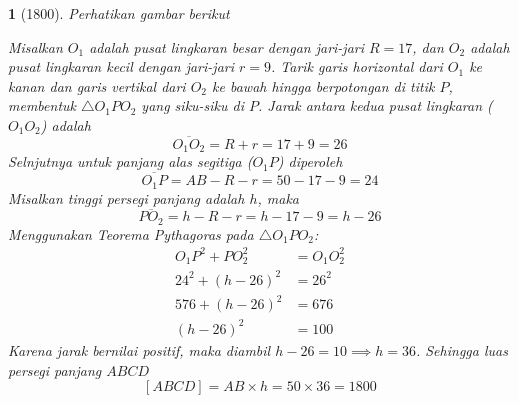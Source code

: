 \documentclass[11pt,a4paper,DIV=12]{scrartcl}
\theoremstyle{problemstyle}
\theoremstyle{answerstyle}
\newtheorem{answer}{}
\begin{document}
\begin{answer}[1800]
  Perhatikan gambar berikut
  \begin{center}
  \end{center}
  Misalkan $O_1$ adalah pusat lingkaran besar dengan jari-jari $R=17$, dan $O_2$ adalah pusat lingkaran kecil dengan jari-jari $r=9$.
  Tarik garis horizontal dari $O_1$ ke kanan dan garis vertikal dari $O_2$ ke bawah hingga berpotongan di titik $P$, membentuk $\triangle O_1PO_2$ yang siku-siku di $P$.
  Jarak antara kedua pusat lingkaran ($O_1O_2$) adalah
  $$ \overline{O_1O_2} = R + r = 17 + 9 = 26 $$
  Selnjutnya untuk panjang alas segitiga ($O_1P$) diperoleh
  $$ \overline{O_1P} = AB - R - r = 50 - 17 - 9 = 24 $$
  Misalkan tinggi persegi panjang adalah $h$, maka
  $$ \overline{PO_2} = h - R - r = h - 17 - 9 = h - 26 $$
  Menggunakan Teorema Pythagoras pada $\triangle O_1PO_2$:
  \begin{align*}
    O_1P^2 + PO_2^2   & = O_1O_2^2 \\
    24^2 + (h - 26)^2 & = 26^2     \\
    576 + (h - 26)^2  & = 676      \\
    (h - 26)^2        & = 100
  \end{align*}
  Karena jarak bernilai positif, maka diambil $h - 26 = 10 \implies h = 36$.
  Sehingga luas persegi panjang $ABCD$
  $$ [ABCD] = AB \times h = 50 \times 36 = \boxed{1800} $$
\end{answer}
\end{document}
